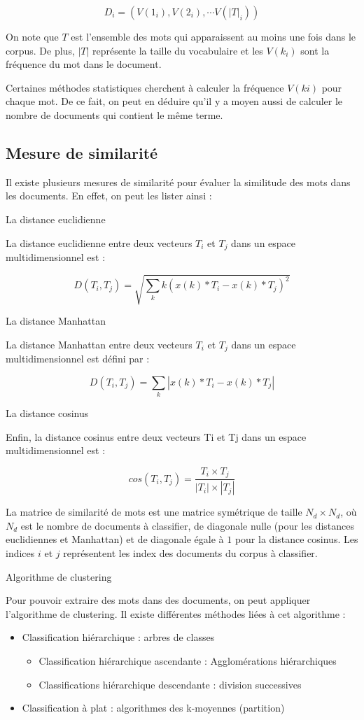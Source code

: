 \documentclass[a4paper,10pt]{article}
\begin{document}
$$D_i=(V(1_i), V(2_i),\cdots V(|T|_i))$$

On note que $T$ est l’ensemble des mots qui apparaissent au moins
une fois dans le corpus. De plus, $|T|$ représente la taille du
vocabulaire et les $V(k_i)$ sont la fréquence du mot dans le document.

Certaines méthodes statistiques cherchent à calculer la fréquence
$V(ki)$ pour chaque mot.
De ce fait, on peut en déduire qu’il y a moyen aussi de calculer
le nombre de documents qui contient le même terme.

\subsection*{Mesure de similarité}

Il existe plusieurs mesures de similarité pour évaluer la
similitude des mots dans les documents.
En effet, on peut les lister ainsi :

La distance euclidienne

La distance euclidienne entre deux vecteurs $T_i$ et $T_j$
dans un espace multidimensionnel est :

$$D(T_i, T_j) =
\sqrt{\sum _k k(x(k)*T_i-x(k)*T_j)^2}$$

La distance Manhattan

La distance Manhattan entre deux vecteurs $T_i$ et $T_j$
dans un espace multidimensionnel est défini par :

$$D(T_i,T_j) =
\sum _k \left|x(k)*T_i-x(k)*T_j\right|$$

La distance cosinus

Enfin, la distance cosinus entre deux vecteurs Ti et Tj dans un
espace multidimensionnel est :

$$cos(T_i,T_j) =
\frac{T_i\times T_j}
{\left|T_i\right|\times\left|T_j\right|}$$

La matrice de similarité de mots est une matrice symétrique
de taille $N_d \times N_d$, où $N_d$ est le nombre de documents
à classifier, de diagonale nulle
(pour les distances euclidiennes et Manhattan)
et de diagonale égale à $1$ pour la distance cosinus.
Les indices $i$ et $j$ représentent les index des documents
du corpus à classifier.

Algorithme de clustering

Pour pouvoir extraire des mots dans des documents,
on peut appliquer l’algorithme de clustering.
Il existe différentes méthodes liées à cet algorithme :

\begin{itemize}
\item Classification hiérarchique : arbres de classes
    \begin{itemize}
    \item Classification hiérarchique ascendante :
    Agglomérations hiérarchiques
    \item Classifications hiérarchique descendante :
    division successives
    \end{itemize}
\item Classification à plat :
algorithmes des k-moyennes (partition)
\end{itemize}
\end{document}
